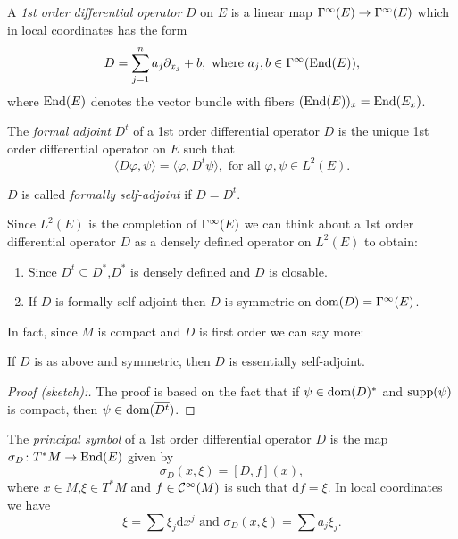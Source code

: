 \begin{definition}
 A \emph{1st order differential operator} $D$ on $E$ is a linear map $\Gamma^\infty(E)\to \Gamma^\infty(E)$ which in local coordinates has the form $$D=\sum_{j=1}^na_j\partial_{x_j}+b,\text{ where }a_j,b\in\Gamma^\infty(\mathrm{End}(E)),$$
 where $\mathrm{End}(E)$ denotes the vector bundle with fibers $(\mathrm{End}(E))_x=\mathrm{End} (E_x)$.
\end{definition}

\begin{definition}
 The \emph{formal adjoint} $D^t$ of a 1st order differential operator $D$ is the unique 1st order differential operator on $E$ such that $$\langle D\varphi,\psi\rangle=\langle\varphi,D^t\psi\rangle, \text{ for all }\varphi,\psi\in L^2(E).$$
 
 \noindent $D$ is called \emph{formally self-adjoint} if $D=D^t$.
\end{definition}

\begin{remark}
 Since $L^2(E)$ is the completion of $\Gamma^\infty(E)$ we can think about a 1st order differential operator $D$ as a densely defined operator on $L^2(E)$ to obtain:
 \begin{enumerate}
  \item Since $D^t\subseteq D^\ast$,$D^\ast$ is densely defined and $D$ is closable.
  \item If $D$ is formally self-adjoint then $D$ is symmetric on $\mathrm{dom} (D)=\Gamma^\infty(E)$.
 \end{enumerate}
\end{remark}
In fact, since $M$ is compact and $D$ is first order we can say more:
\begin{proposition}
 If $D$ is as above and symmetric, then $D$ is essentially self-adjoint.
\end{proposition}
\begin{proof}[Proof (sketch):] The proof is based on the fact that if $\psi\in\mathrm{dom} (D)^\ast$ and $\mathrm{supp}(\psi)$ is compact, then $\psi\in\mathrm{dom}(\overline{D^t})$.
\end{proof}

\begin{definition}
 The \emph{principal symbol} of a 1st order differential operator $D$ is the map $\sigma_D\colon T^\ast M\to\mathrm{End}(E)$ given by $$\sigma_D(x,\xi)=[D,f](x),$$ where $x\in M$,$\xi\in T^\ast M$ and $f\in\mathcal{C}^\infty(M)$ is such that $\mathrm{d}f=\xi$.  In local coordinates we have $$\xi=\sum\xi_j\mathrm{d}x^j\text{ and }\sigma_D(x,\xi)=\sum a_j\xi_j.$$ 
\end{definition}

